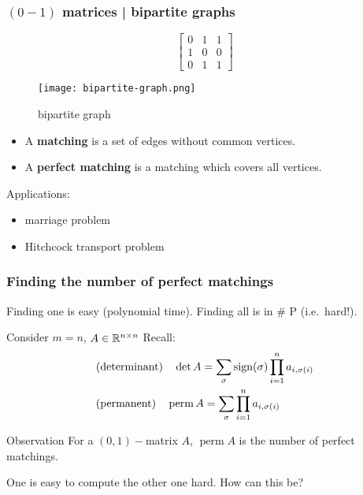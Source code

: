 \documentclass{beamer}
\DeclareMathOperator*{\perm}{perm}
\begin{document}
\begin{frame}
  \frametitle{$(0-1)$ matrices | bipartite graphs}
  \begin{minipage}{0.5\textwidth}
    \begin{equation}
      \begin{bmatrix}
        0 & 1 & 1 \\
        1 & 0 & 0 \\
        0 & 1 & 1
      \end{bmatrix}
    \end{equation}
  \end{minipage}
  \begin{minipage}{0.35\textwidth}
    \begin{figure}[ht]
      \centering
      \texttt{[image: bipartite-graph.png]}
      \caption{bipartite graph}
    \end{figure}
  \end{minipage}

    \begin{definition}
      \begin{itemize}
        \item A \textbf{matching} is a set of edges without common vertices.
        \item A \textbf{perfect matching} is a matching which covers all vertices.
      \end{itemize}
    \end{definition}
    Applications:
    \begin{itemize}
      \item marriage problem
      \item Hitchcock transport problem
    \end{itemize}
\end{frame}

\begin{frame}
  \frametitle{Finding the number of perfect matchings}
  Finding one is easy (polynomial time).
  Finding all is in \# P (i.e.\ hard!).
  \begin{block}{Consider $m=n$, $A\in \mathbb{R}^{n \times n}$}
    Recall:
    \begin{equation}
      \begin{aligned}
        &\text{(determinant)} \quad \det A = \sum_{\sigma} \sign(\sigma) \prod_{i=1}^n a_{i,\sigma(i)}  \\
        &\text{(permanent)} \quad \perm A = \sum_{\sigma} \prod_{i=1}^n a_{i,\sigma(i)}
      \end{aligned}
    \end{equation}
  \end{block}
  \begin{block}{Observation}
    For a $(0,1)-$matrix $A$, $\perm A$ is the number of perfect matchings.
  \end{block}
  One is easy to compute the other one hard. How can this be?
\end{frame}
\end{document}

